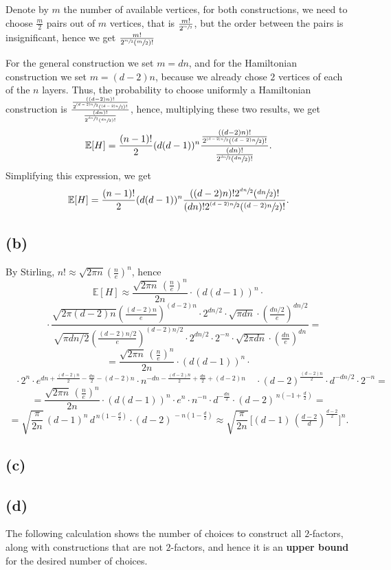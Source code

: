 \documentclass{article}
\begin{document}
Denote by $m$ the number of available vertices, for both constructions, we need to choose $\frac{m}{2}$ pairs out of $m$ vertices, that is $\frac{m!}{2^{\sfrac{m}{2}}}$, but the order between the pairs is insignificant, hence we get $\frac{m!}{2^{\sfrac{m}{2}}(\sfrac{m}{2})!}$

For the general construction we set $m=dn$, and for the Hamiltonian construction we set $m=(d-2)n$, because we already chose $2$ vertices of each of the $n$ layers. Thus, the probability to choose uniformly a Hamiltonian construction is $\frac{\frac{((d-2)n)!}{2^{\sfrac{(d-2)n}{2}}(\sfrac{(d-2)n}{2})!}}{\frac{(dn)!}{2^{\sfrac{dn}{2}}(\sfrac{dn}{2})!}}$, hence, multiplying these two results, we get \[
\mathbb{E}[H]=\frac{(n-1)!}{2}(d(d-1))^n\frac{\frac{((d-2)n)!}{2^{\sfrac{(d-2)n}{2}}(\sfrac{(d-2)n}{2})!}}{\frac{(dn)!}{2^{\sfrac{dn}{2}}(\sfrac{dn}{2})!}}
.\]
Simplifying this expression, we get
\[
\mathbb{E}[H]=\frac{(n-1)!}{2}(d(d-1))^n\frac{((d-2)n)!2^{\sfrac{dn}{2}}(\sfrac{dn}{2})!}{(dn)!2^{\sfrac{(d-2)n}{2}}(\sfrac{(d-2)n}{2})!}
.\]
\subsection*{(b)}
By Stirling, $n!\approx\sqrt{2\pi{n}}(\frac{n}{e})^n$, hence 
\[\mathbb{E}[H]\approx\frac{\sqrt{2\pi n}\,\left(\tfrac{n}{e}\right)^n}{2n}
\cdot(d(d-1))^n\cdot\]\[
\quad\cdot\frac{\sqrt{2\pi{(d-2)n}}\left(\tfrac{(d-2)n}{e}\right)^{(d-2)n}\cdot{2^{dn/2}}\cdot\sqrt{\pi dn}\cdot\left(\tfrac{dn/2}{e}\right)^{dn/2}}
         {\sqrt{\pi dn/2}\left(\tfrac{(d-2)n/2}{e}\right)^{(d-2)n/2}\cdot 2^{dn/2}\cdot2^{-n}\cdot\sqrt{2\pi dn}\cdot\left(\tfrac{dn}{e}\right)^{dn}}
=\]\[=\frac{\sqrt{2\pi{n}}\,\left(\tfrac{n}{e}\right)^n}{2n}\cdot(d(d-1))^n\cdot\]
\[\quad\cdot2^n\cdot e^{dn+\tfrac{(d-2)n}{2}-\tfrac{dn}{2}-(d-2)n}\cdot{n}^{-dn- \tfrac{(d-2)n}{2}+\tfrac{dn}{2}+(d-2)n}
\quad\cdot(d-2)^{\tfrac{(d-2)n}{2}} \cdot{d}^{-dn/2}\cdot{2^{-n}}
=\]\[=\frac{\sqrt{2\pi n}\,\left(\tfrac{n}{e}\right)^n}{2n}\cdot(d(d-1))^n\cdot{e^n} \cdot{n^{-n}}
    \cdot{d}^{-\tfrac{dn}{2}}\cdot(d-2)^{\,n(-1+\tfrac{d}{2})}
=\]\[=\sqrt{\frac{\pi}{2n}}\,(d-1)^n\,d^{\,n(1-\tfrac{d}{2})}\cdot(d-2)^{\,-n(1-\tfrac{d}{2})}
\approx\sqrt{\frac{\pi}{2n}}\,\Big[(d-1)\,\left(\tfrac{d-2}{d}\right)^{\tfrac{d-2}{2}}\Big]^n.\]
\subsection*{(c)}

\subsection*{(d)}
The following calculation shows the number of choices to construct all $2$-factors, along with constructions that are not $2$-factors, and hence it is an \textbf{upper bound} for the desired number of choices.
\end{document}
